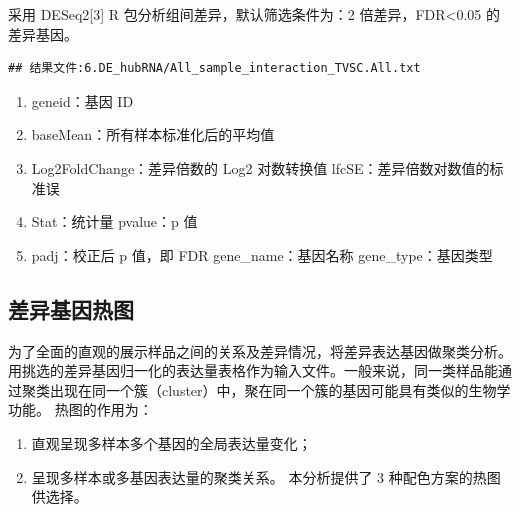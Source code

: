 \documentclass[
]{ctexart}
\providecommand{\tightlist}{%
  \setlength{\itemsep}{0pt}\setlength{\parskip}{0pt}}
\begin{document}
采用 DESeq2{[}3{]} R 包分析组间差异，默认筛选条件为：2 倍差异，FDR\textless0.05
的差异基因。

\begin{verbatim}
## 结果文件:6.DE_hubRNA/All_sample_interaction_TVSC.All.txt
\end{verbatim}

\begin{table}[H]

\caption{\label{tab:unnamed-chunk-13}数据比对统计表}
\centering
{}
\end{table}

\begin{enumerate}
\def\labelenumi{(\arabic{enumi})}
\tightlist
\item
  geneid：基因 ID
\item
  baseMean：所有样本标准化后的平均值
\item
  Log2FoldChange：差异倍数的 Log2 对数转换值 lfcSE：差异倍数对数值的标准误
\item
  Stat：统计量 pvalue：p 值
\item
  padj：校正后 p 值，即 FDR gene\_name：基因名称 gene\_type：基因类型
\end{enumerate}

\hypertarget{ux5deeux5f02ux57faux56e0ux70edux56fe-1}{%
\subsection{差异基因热图}\label{ux5deeux5f02ux57faux56e0ux70edux56fe-1}}

为了全面的直观的展示样品之间的关系及差异情况，将差异表达基因做聚类分析。用挑选的差异基因归一化的表达量表格作为输入文件。一般来说，同一类样品能通过聚类出现在同一个簇（cluster）中，聚在同一个簇的基因可能具有类似的生物学功能。
热图的作用为：

\begin{enumerate}
\def\labelenumi{(\arabic{enumi})}
\tightlist
\item
  直观呈现多样本多个基因的全局表达量变化；
\item
  呈现多样本或多基因表达量的聚类关系。
  本分析提供了 3 种配色方案的热图供选择。
\end{enumerate}
\end{document}
